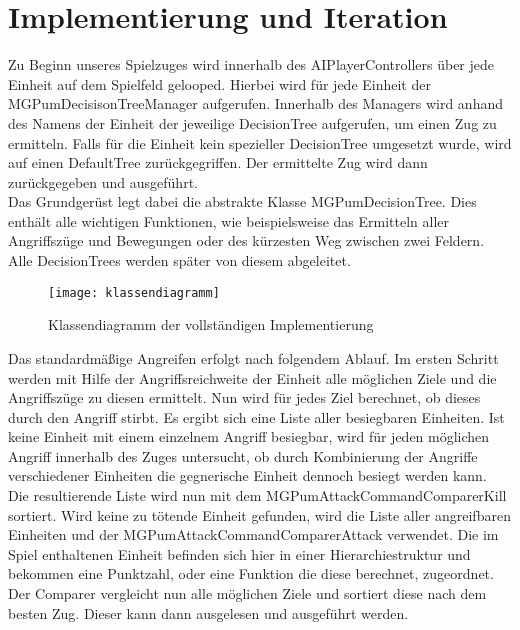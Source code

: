 

\chapter{Implementierung und Iteration}

Zu Beginn unseres Spielzuges wird innerhalb des AIPlayerControllers über jede Einheit auf dem Spielfeld gelooped. Hierbei wird für jede Einheit der MGPumDecisisonTreeManager aufgerufen. Innerhalb des Managers wird anhand des Namens der Einheit der jeweilige DecisionTree aufgerufen, um einen Zug zu ermitteln. Falls für die Einheit kein spezieller DecisionTree umgesetzt wurde, wird auf einen DefaultTree zurückgegriffen. Der ermittelte Zug wird dann zurückgegeben und ausgeführt.\\
Das Grundgerüst legt dabei die abstrakte Klasse MGPumDecisionTree. Dies enthält alle wichtigen Funktionen, wie beispielsweise das Ermitteln aller Angriffszüge und Bewegungen oder des kürzesten Weg zwischen zwei Feldern. Alle DecisionTrees werden später von diesem abgeleitet. 

\begin{figure}[H]
	\centering
	\texttt{[image: klassendiagramm]}
	\caption{Klassendiagramm der vollständigen Implementierung}
	\label{fig:klassendiagramm}
\end{figure}

Das standardmäßige Angreifen erfolgt nach folgendem Ablauf. Im ersten Schritt werden mit Hilfe der Angriffsreichweite der Einheit alle möglichen Ziele und die Angriffszüge zu diesen ermittelt. Nun wird für jedes Ziel berechnet, ob dieses durch den Angriff stirbt. Es ergibt sich eine Liste aller besiegbaren Einheiten. Ist keine Einheit mit einem einzelnem Angriff besiegbar, wird für jeden möglichen Angriff innerhalb des Zuges untersucht, ob durch Kombinierung der Angriffe verschiedener Einheiten die gegnerische Einheit dennoch besiegt werden kann. Die resultierende Liste wird nun mit dem MGPumAttackCommandComparerKill sortiert. Wird keine zu tötende Einheit gefunden, wird die Liste aller angreifbaren Einheiten und der MGPumAttackCommandComparerAttack verwendet. Die im Spiel enthaltenen Einheit befinden sich hier in einer Hierarchiestruktur und bekommen eine Punktzahl, oder eine Funktion die diese berechnet, zugeordnet. Der Comparer vergleicht nun alle möglichen Ziele und sortiert diese nach dem besten Zug. Dieser kann dann ausgelesen und ausgeführt werden.

